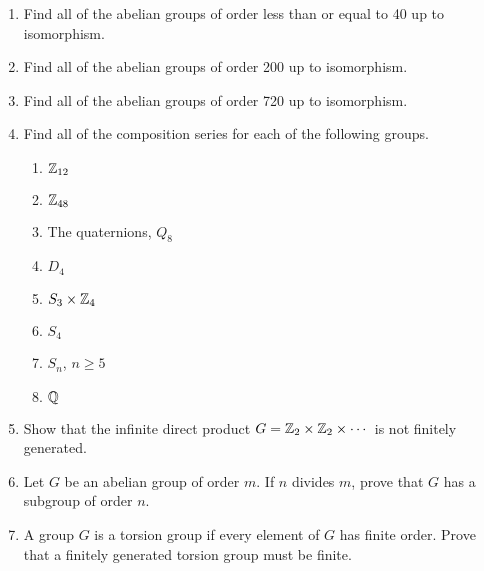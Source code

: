 {\small
\begin{enumerate}
 
\item
Find all of the abelian groups of order less than or equal to 40 up to
isomorphism.
 
\item
Find all of the abelian groups of order 200 up to isomorphism.
 
\item
Find all of the abelian groups of order 720 up to isomorphism.
 
\item
Find all of the composition series for each of the following groups.
\begin{multicols}{2}
\begin{enumerate}

\item
${\Bbb Z}_{12}$

\item
${\Bbb Z}_{48}$

\item
The quaternions, $Q_8$

\item
$D_4$

\item
$S_3 \times {\Bbb Z}_4$

\item
$S_4$

\item
$S_n$, $n \geq 5$

\item
${\Bbb Q}$


\end{enumerate}
\end{multicols}
 
 
 
 
\item  %
Show that the infinite direct product $G = {\Bbb Z}_2 \times {\Bbb
Z}_2 \times \cdots$ is not finitely generated.
 
 
 
\item
Let $G$ be an abelian group of order $m$.  If $n$ divides $m$, prove
that $G$ has a subgroup of order $n$.
 
\item
A group $G$ is a {\bfi torsion group\/} if every 
element of $G$ has finite order.  Prove that a finitely generated 
torsion group must be finite.
 

\end{enumerate}}
